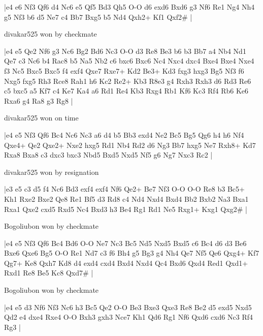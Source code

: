 \makegametitle
|e4 e6 Nf3 Qf6 d4 Nc6 e5 Qf5 Bd3 Qh5 O-O d6 exd6 Bxd6 g3 Nf6 Re1 Ng4 Nh4 g5 Nf3 b6 d5 Ne7 c4 Bb7 Bxg5 b5 Nd4 Qxh2+ Kf1 Qxf2\#  |

\showboard

divakar525 won by checkmate

\makegametitle
|e4 e5 Qe2 Nf6 g3 Nc6 Bg2 Bd6 Nc3 O-O d3 Re8 Be3 b6 b3 Bb7 a4 Nb4 Nd1 Qe7 c3 Nc6 b4 Rac8 b5 Na5 Nb2 c6 bxc6 Bxc6 Nc4 Nxc4 dxc4 Bxe4 Bxe4 Nxe4 f3 Nc5 Bxc5 Bxc5 f4 exf4 Qxe7 Rxe7+ Kd2 Be3+ Kd3 fxg3 hxg3 Bg5 Nf3 f6 Nxg5 fxg5 Rh3 Rce8 Rah1 h6 Kc2 Re2+ Kb3 R8e3 g4 Rxh3 Rxh3 d6 Rd3 Re6 c5 bxc5 a5 Kf7 c4 Ke7 Ka4 a6 Rd1 Re4 Kb3 Rxg4 Rb1 Kf6 Kc3 Rf4 Rb6 Ke6 Rxa6 g4 Ra8 g3 Rg8  |

\showboard

divakar525 won on time

\makegametitle
|e4 e5 Nf3 Qf6 Bc4 Nc6 Nc3 a6 d4 b5 Bb3 exd4 Ne2 Bc5 Bg5 Qg6 h4 h6 Nf4 Qxe4+ Qe2 Qxe2+ Nxe2 hxg5 Rd1 Nb4 Rd2 d6 Ng3 Bb7 hxg5 Ne7 Rxh8+ Kd7 Rxa8 Bxa8 c3 dxc3 bxc3 Nbd5 Bxd5 Nxd5 Nf5 g6 Ng7 Nxc3 Rc2  |

\showboard

divakar525 won by resignation

\makegametitle
|e3 e5 c3 d5 f4 Nc6 Bd3 exf4 exf4 Nf6 Qe2+ Be7 Nf3 O-O O-O Re8 b3 Bc5+ Kh1 Rxe2 Bxe2 Qe8 Re1 Bf5 d3 Rd8 c4 Nd4 Nxd4 Bxd4 Bb2 Bxb2 Na3 Bxa1 Rxa1 Qxe2 cxd5 Rxd5 Nc4 Bxd3 h3 Be4 Rg1 Rd1 Ne5 Rxg1+ Kxg1 Qxg2\#  |

\showboard

Bogoliubon won by checkmate

\makegametitle
|e4 e5 Nf3 Qf6 Bc4 Bd6 O-O Ne7 Nc3 Bc5 Nd5 Nxd5 Bxd5 c6 Bc4 d6 d3 Be6 Bxe6 Qxe6 Bg5 O-O Re1 Nd7 c3 f6 Bh4 g5 Bg3 g4 Nh4 Qe7 Nf5 Qe6 Qxg4+ Kf7 Qg7+ Ke8 Qxh7 Kd8 d4 exd4 cxd4 Bxd4 Nxd4 Qc4 Bxd6 Qxd4 Red1 Qxd1+ Rxd1 Re8 Be5 Kc8 Qxd7\#  |

\showboard

Bogoliubon won by checkmate

\makegametitle
|e4 e5 d3 Nf6 Nf3 Nc6 h3 Bc5 Qe2 O-O Be3 Bxe3 Qxe3 Re8 Be2 d5 exd5 Nxd5 Qd2 e4 dxe4 Rxe4 O-O Bxh3 gxh3 Nce7 Kh1 Qd6 Rg1 Nf6 Qxd6 cxd6 Nc3 Rf4 Rg3  |

